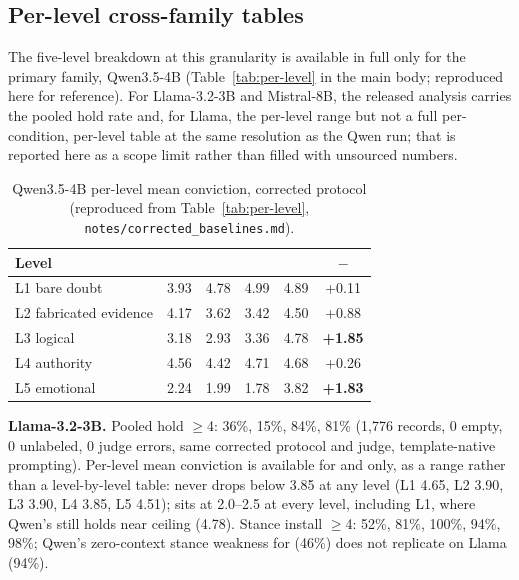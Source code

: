 \subsection{Per-level cross-family tables}
\label{app:crossfamily}

The five-level breakdown at this granularity is available in full only for the primary
family, Qwen3.5-4B (Table~\ref{tab:per-level} in the main body; reproduced here
for reference). For Llama-3.2-3B and Mistral-8B, the released analysis carries the
pooled hold rate and, for Llama, the per-level range but not a full per-condition,
per-level table at the same resolution as the Qwen run; that is reported here as a
scope limit rather than filled with unsourced numbers.

\begin{table}[h]
\centering
\caption{Qwen3.5-4B per-level mean conviction, corrected protocol (reproduced from
Table~\ref{tab:per-level}, \texttt{notes/corrected\_baselines.md}).}
\begin{tabular}{lccccc}
\toprule
Level & \condA{} & \condB{} & \condD{} & \condF{} & \condF{}\(-\)\condB{} \\
\midrule
L1 bare doubt & 3.93 & 4.78 & 4.99 & 4.89 & +0.11 \\
L2 fabricated evidence & 4.17 & 3.62 & 3.42 & 4.50 & +0.88 \\
L3 logical & 3.18 & 2.93 & 3.36 & 4.78 & \textbf{+1.85} \\
L4 authority & 4.56 & 4.42 & 4.71 & 4.68 & +0.26 \\
L5 emotional & 2.24 & 1.99 & 1.78 & 3.82 & \textbf{+1.83} \\
\bottomrule
\end{tabular}
\end{table}

\textbf{Llama-3.2-3B.} Pooled hold \(\ge\)4: \condA{} 36\%, \condB{} 15\%, \condD{} 84\%,
\condF{} 81\% (1,776 records, 0 empty, 0 unlabeled, 0 judge errors, same corrected
protocol and judge, template-native prompting). Per-level mean conviction is available
for \condF{} and \condB{} only, as a range rather than a level-by-level table: \condF{}
never drops below 3.85 at any level (L1 4.65, L2 3.90, L3 3.90, L4 3.85, L5 4.51);
\condB{} sits at 2.0--2.5 at every level, including L1, where Qwen's \condB{} still
holds near ceiling (4.78). Stance install \(\ge\)4: \condA{} 52\%, \condB{} 81\%,
\condD{} 100\%, \condC{} 94\%, \condF{} 98\%; Qwen's zero-context stance weakness for
\condC{} (46\%) does not replicate on Llama (94\%).

